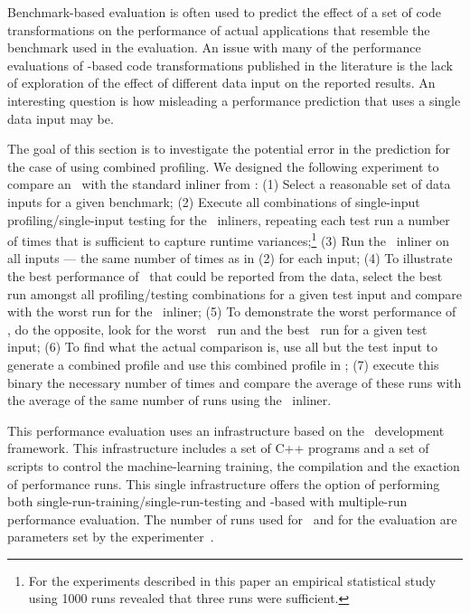 
Benchmark-based evaluation is often used to predict the effect of a set of code transformations on the performance of actual applications that resemble the benchmark used in the evaluation. An issue with many of the performance evaluations of \FDO-based code transformations published in the literature is the lack of exploration of the effect of different data input on the reported results. An interesting question is how misleading a performance prediction that uses a single data input may be.

The goal of this section is to investigate the potential error in the prediction for the case of \FDI using combined profiling. We designed the following experiment to compare an \FDI\ with the standard inliner from \llvm: (1) Select a reasonable set of data inputs for a given benchmark; (2) Execute all combinations of single-input profiling/single-input testing for the \FDO\ inliners, repeating each test run a number of times that is sufficient to capture runtime variances;\footnote{For the experiments described in this paper an empirical statistical study using 1000 runs revealed that three runs were sufficient.}  (3) Run the \llvm\ inliner on all inputs --- the same number of times as in (2) for each input; (4) To illustrate the best performance of \FDI\ that could be reported from the data, select the best run amongst all profiling/testing combinations for a given test input and compare with the worst run for the \llvm\ inliner; (5) To demonstrate the worst performance of \FDI, do the opposite, look for the worst \FDI\ run and the best \llvm\ run for a given test input; (6) To find what the actual comparison is, use all but the test input to generate a combined profile and use this combined profile in \FDI; (7) execute this binary the necessary number of times and compare the average of these runs with the average of the same number of runs using the \llvm\ inliner.


This performance evaluation uses an infrastructure based on the \llvm\ development framework. This infrastructure includes a set of C++ programs and a set of scripts to control the machine-learning training, the compilation and the exaction of performance runs. This single infrastructure offers the option of performing both single-run-training/single-run-testing \FDO and  \CP-based \FDO with multiple-run performance evaluation. The number of runs used for \CP\ and for the evaluation are parameters set by the experimenter~\cite{BerubePhD}.

